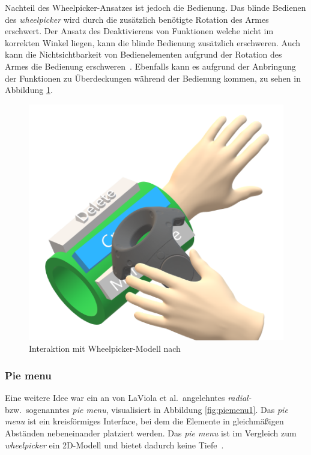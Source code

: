 \noindent Nachteil des Wheelpicker-Ansatzes ist jedoch die Bedienung. Das blinde Bedienen des \textit{wheelpicker} wird durch die zusätzlich benötigte Rotation des  Armes erschwert. Der Ansatz des Deaktivierens von Funktionen welche nicht im korrekten Winkel liegen, kann die blinde Bedienung zusätzlich erschweren. Auch kann die Nichtsichtbarkeit von Bedienelementen aufgrund der Rotation des Armes die Bedienung erschweren~\cite{theoryandpracticebook}. Ebenfalls kann es aufgrund der Anbringung der Funktionen zu Überdeckungen während der Bedienung kommen, zu sehen in Abbildung \ref{fig:wheelpicker2}.

\begin{figure}[h]
\captionsetup{width=.7\linewidth}
\includegraphics[scale=0.5]{Bilder/Hauptteil/konzept9}
\centering
\caption{Interaktion mit Wheelpicker-Modell nach~\cite[p.~33]{wheelpickerpiemenu}}
\label{fig:wheelpicker2}
\end{figure}

\subsubsection*{Pie menu}
\noindent Eine weitere Idee war ein an von LaViola et al.~angelehntes \textit{radial-} bzw.~sogenanntes \textit{pie menu}, visualisiert in Abbildung \ref{fig:piemenu1}. Das \textit{pie menu} ist ein kreisförmiges Interface, bei dem die Elemente in gleichmäßigen Abständen nebeneinander platziert werden. Das \textit{pie menu} ist im Vergleich zum \textit{wheelpicker} ein 2D-Modell und bietet dadurch keine Tiefe~\cite{theoryandpracticebook}.

